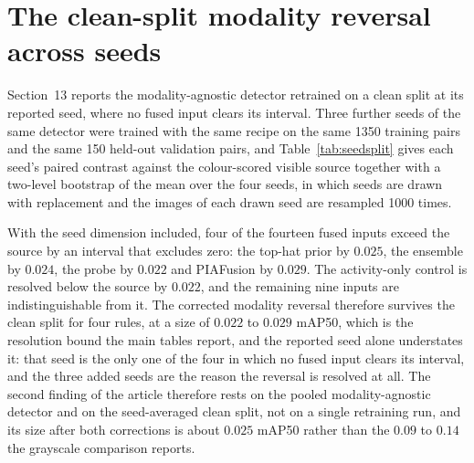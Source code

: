 \documentclass[11pt,a4paper]{article}
\begin{document}
\section{The clean-split modality reversal across seeds}

Section~13 reports the modality-agnostic detector retrained on a clean split at its
reported seed, where no fused input clears its interval. Three further seeds of the same
detector were trained with the same recipe on the same 1350 training pairs and the same
150 held-out validation pairs, and Table~\ref{tab:seedsplit} gives each seed's paired
contrast against the colour-scored visible source together with a two-level bootstrap of
the mean over the four seeds, in which seeds are drawn with replacement and the images
of each drawn seed are resampled 1000 times.

With the seed dimension included, four of the fourteen fused inputs exceed the source by
an interval that excludes zero: the top-hat prior by $0.025$, the ensemble by $0.024$,
the probe by $0.022$ and PIAFusion by $0.029$. The activity-only control is resolved
below the source by $0.022$, and the remaining nine inputs are indistinguishable from
it. The corrected modality reversal therefore survives the clean split for four rules,
at a size of $0.022$ to $0.029$ mAP50, which is the resolution bound the main tables
report, and the reported seed alone understates it: that seed is the only one of the
four in which no fused input clears its interval, and the three added seeds are the
reason the reversal is resolved at all. The second finding of the article therefore rests
on the pooled modality-agnostic detector and on the seed-averaged clean split, not on a
single retraining run, and its size after both corrections is about $0.025$ mAP50
rather than the $0.09$ to $0.14$ the grayscale comparison reports.
\end{document}

